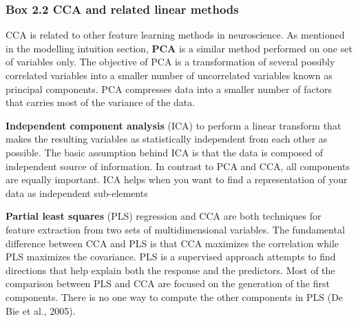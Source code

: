 \linespacesmall
\begin{shaded}
\footnotesize
\subsubsection*{Box 2.2 CCA and related linear methods}
\label{box:2}

\begin{minipage}[t]{1\textwidth}
\begin{multicols}{2}
CCA is related to other feature learning methods in neuroscience. As mentioned in the modelling intuition section, \textbf{PCA} is a similar method performed on one set of variables only. The objective of PCA is a transformation of several possibly correlated variables into a smaller number of uncorrelated variables known as principal components. PCA compresses data into a smaller number of factors that carries most of the variance of the data.

\textbf{Independent component analysis} (ICA) to perform a linear transform that makes the resulting variables as statistically independent from each other as possible. The basic assumption behind ICA is that the data is composed of independent source of information. In contrast to PCA and CCA, all components are equally important.  ICA helps when you want to find a representation of your data as independent sub-elements

\textbf{Partial least squares} (PLS) regression and CCA are both techniques for feature extraction from two sets of multidimensional variables. The fundamental difference between CCA and PLS is that CCA maximizes the correlation while PLS maximizes the covariance. PLS is a supervised approach attempts to find directions that help explain both the response and the predictors. Most of the comparison between PLS and CCA are focused on the generation of the first components. There is no one way to compute the other components in PLS (De Bie et al., 2005). 

\end{multicols}
\end{minipage}
\end{shaded}
\linespacenormal

